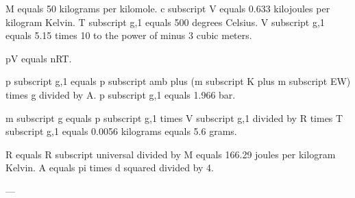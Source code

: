 M equals 50 kilograms per kilomole.  
c subscript V equals 0.633 kilojoules per kilogram Kelvin.  
T subscript g,1 equals 500 degrees Celsius.  
V subscript g,1 equals 5.15 times 10 to the power of minus 3 cubic meters.  

pV equals nRT.  

p subscript g,1 equals p subscript amb plus (m subscript K plus m subscript EW) times g divided by A.  
p subscript g,1 equals 1.966 bar.  

m subscript g equals p subscript g,1 times V subscript g,1 divided by R times T subscript g,1 equals 0.0056 kilograms equals 5.6 grams.  

R equals R subscript universal divided by M equals 166.29 joules per kilogram Kelvin.  
A equals pi times d squared divided by 4.  

---